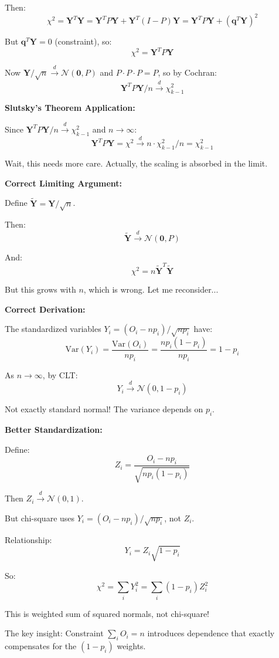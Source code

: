 \documentclass[12pt]{article}
\begin{document}
\begin{explanation}
Then:
\[
\chi^2 = \mathbf{Y}^T\mathbf{Y} = \mathbf{Y}^TP\mathbf{Y} + \mathbf{Y}^T(I - P)\mathbf{Y} = \mathbf{Y}^TP\mathbf{Y} + (\mathbf{q}^T\mathbf{Y})^2
\]

But $\mathbf{q}^T\mathbf{Y} = 0$ (constraint), so:
\[
\chi^2 = \mathbf{Y}^TP\mathbf{Y}
\]

Now $\mathbf{Y}/\sqrt{n} \xrightarrow{d} \mathcal{N}(\mathbf{0}, P)$ and $P \cdot P \cdot P = P$, so by Cochran:
\[
\mathbf{Y}^TP\mathbf{Y}/n \xrightarrow{d} \chi^2_{k-1}
\]

\textbf{Slutsky's Theorem Application:}

Since $\mathbf{Y}^TP\mathbf{Y}/n \xrightarrow{d} \chi^2_{k-1}$ and $n \to \infty$:
\[
\mathbf{Y}^TP\mathbf{Y} = \chi^2 \xrightarrow{d} n \cdot \chi^2_{k-1}/n = \chi^2_{k-1}
\]

Wait, this needs more care. Actually, the scaling is absorbed in the limit.

\textbf{Correct Limiting Argument:}

Define $\tilde{\mathbf{Y}} = \mathbf{Y}/\sqrt{n}$.

Then:
\[
\tilde{\mathbf{Y}} \xrightarrow{d} \mathcal{N}(\mathbf{0}, P)
\]

And:
\[
\chi^2 = n\tilde{\mathbf{Y}}^T\tilde{\mathbf{Y}}
\]

But this grows with $n$, which is wrong. Let me reconsider...

\textbf{Correct Derivation:}

The standardized variables $Y_i = (O_i - np_i)/\sqrt{np_i}$ have:
\[
\text{Var}(Y_i) = \frac{\text{Var}(O_i)}{np_i} = \frac{np_i(1-p_i)}{np_i} = 1 - p_i
\]

As $n \to \infty$, by CLT:
\[
Y_i \xrightarrow{d} \mathcal{N}(0, 1-p_i)
\]

Not exactly standard normal! The variance depends on $p_i$.

\textbf{Better Standardization:}

Define:
\[
Z_i = \frac{O_i - np_i}{\sqrt{np_i(1-p_i)}}
\]

Then $Z_i \xrightarrow{d} \mathcal{N}(0, 1)$.

But chi-square uses $Y_i = (O_i - np_i)/\sqrt{np_i}$, not $Z_i$.

Relationship:
\[
Y_i = Z_i\sqrt{1 - p_i}
\]

So:
\[
\chi^2 = \sum_i Y_i^2 = \sum_i (1-p_i)Z_i^2
\]

This is weighted sum of squared normals, not chi-square!

The key insight: Constraint $\sum_i O_i = n$ introduces dependence that exactly compensates for the $(1-p_i)$ weights.


\end{explanation}
\end{document}
